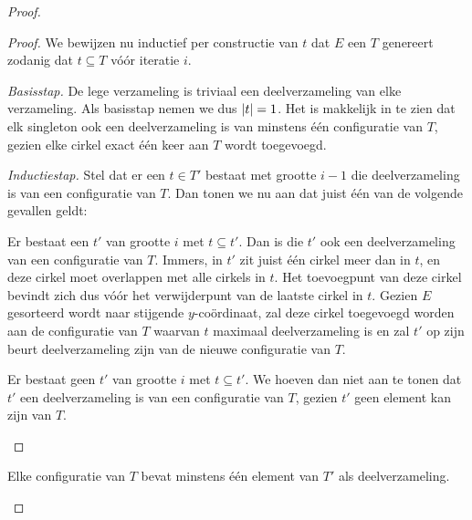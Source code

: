 \begin{proof}
\begin{proof}


We bewijzen nu inductief per constructie van $t$ dat $E$ een $T$
genereert zodanig dat $t \subseteq T$ v\'o\'or iteratie $i$.

\textit{Basisstap.} De lege verzameling is triviaal een
deelverzameling van elke verzameling. Als basisstap nemen we dus
$\left|t\right| = 1$. Het is makkelijk in te zien dat elk singleton ook
een deelverzameling is van minstens \'e\'en configuratie van $T$, gezien
elke cirkel exact \'e\'en keer aan $T$ wordt toegevoegd.

\textit{Inductiestap.} Stel dat er een $t \in T'$ bestaat met grootte
$i - 1$ die deelverzameling is van een configuratie van $T$. Dan tonen
we nu aan dat juist \'e\'en van de volgende gevallen geldt:

\begin{geval}
Er bestaat een $t'$ van grootte $i$ met $t \subseteq t'$. Dan is die
$t'$ ook een deelverzameling van een configuratie van $T$. Immers, in
$t'$ zit juist \'e\'en cirkel meer dan in $t$, en deze cirkel moet
overlappen met alle cirkels in $t$. Het toevoegpunt van deze cirkel
bevindt zich dus v\'o\'or het verwijderpunt van de laatste cirkel in
$t$. Gezien $E$ gesorteerd wordt naar stijgende $y$-co\"ordinaat, zal
deze cirkel toegevoegd worden aan de configuratie van $T$ waarvan $t$
maximaal deelverzameling is en zal $t'$ op zijn beurt deelverzameling
zijn van de nieuwe configuratie van $T$.
\end{geval}

\begin{geval}
Er bestaat geen $t'$ van grootte $i$ met $t \subseteq t'$. We hoeven
dan niet aan te tonen dat $t'$ een deelverzameling is van een
configuratie van $T$, gezien $t'$ geen element kan zijn van $T$.
\end{geval}

\end{proof}

\begin{gevolg}
Elke configuratie van $T$ bevat minstens \'e\'en element van $T'$ als
deelverzameling.
\label{gevolg:sweepline}
\end{gevolg}


\end{proof}
